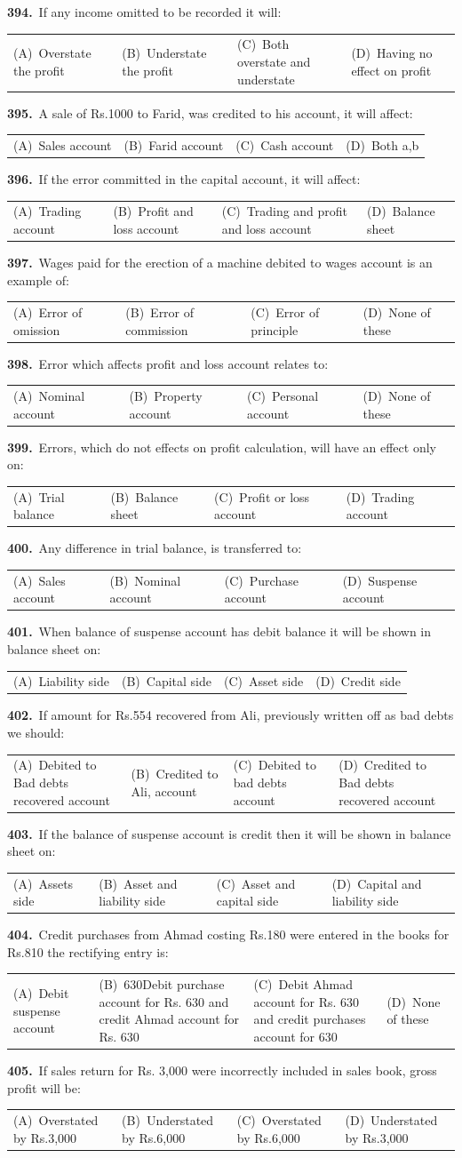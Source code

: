 \documentclass[11pt,a4paper]{article}
\makeatletter
\newcommand{\mcq}[6]{%
  \Needspace{4\baselineskip}%
  \par\medskip\noindent\textbf{#1.}\ #2\par\nopagebreak
  \noindent\begin{tabularx}{\linewidth}{@{\hspace{1.5em}}*{4}{>{\raggedright\arraybackslash}X}@{}}
    (A)~#3 & (B)~#4 & (C)~#5 & (D)~#6
  \end{tabularx}\par}
\makeatother
\begin{document}
\mcq{394}{If any income omitted to be recorded it will:}{Overstate the profit}{Understate the profit}{Both overstate and understate}{Having no effect on profit}
\mcq{395}{A sale of Rs.1000 to Farid, was credited to his account, it will affect:}{Sales account}{Farid account}{Cash account}{Both a,b}
\mcq{396}{If the error committed in the capital account, it will affect:}{Trading account}{Profit and loss account}{Trading and profit and loss account}{Balance sheet}
\mcq{397}{Wages paid for the erection of a machine debited to wages account is an example of:}{Error of omission}{Error of commission}{Error of principle}{None of these}
\mcq{398}{Error which affects profit and loss account relates to:}{Nominal account}{Property account}{Personal account}{None of these}
\mcq{399}{Errors, which do not effects on profit calculation, will have an effect only on:}{Trial balance}{Balance sheet}{Profit or loss account}{Trading account}
\mcq{400}{Any difference in trial balance, is transferred to:}{Sales account}{Nominal account}{Purchase account}{Suspense account}
\mcq{401}{When balance of suspense account has debit balance it will be shown in balance sheet on:}{Liability side}{Capital side}{Asset side}{Credit side}
\mcq{402}{If amount for Rs.554 recovered from Ali, previously written off as bad debts we should:}{Debited to Bad debts recovered account}{Credited to Ali, account}{Debited to bad debts account}{Credited to Bad debts recovered account}
\mcq{403}{If the balance of suspense account is credit then it will be shown in balance sheet on:}{Assets side}{Asset and liability side}{Asset and capital side}{Capital and liability side}
\mcq{404}{Credit purchases from Ahmad costing Rs.180 were entered in the books for Rs.810 the rectifying entry is:}{Debit suspense account}{630Debit purchase account for Rs. 630 and credit Ahmad account for Rs. 630}{Debit Ahmad account for Rs. 630 and credit purchases account for 630}{None of these}
\mcq{405}{If sales return for Rs. 3,000 were incorrectly included in sales book, gross profit will be:}{Overstated by Rs.3,000}{Understated by Rs.6,000}{Overstated by Rs.6,000}{Understated by Rs.3,000}
\end{document}
